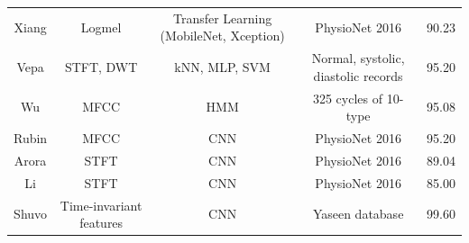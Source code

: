 \begin{table}[h]
\begin{tabularx}{\textwidth}{ccccc}
        Xiang \cite{xiang2023research} & Logmel & Transfer Learning (MobileNet, Xception) & PhysioNet 2016 & 90.23 \\
        Vepa \cite{vepa2009classification} & STFT, DWT & kNN, MLP, SVM & Normal, systolic, diastolic records & 95.20 \\
        Wu \cite{wu2010hidden} & MFCC & HMM & 325 cycles of 10-type & 95.08 \\
        Rubin \cite{rubin2016classifying} & MFCC & CNN & PhysioNet 2016 & 95.20 \\
        Arora \cite{arora2021transfer} & STFT & CNN & PhysioNet 2016 & 89.04 \\
        Li \cite{li2021lightweight} & STFT & CNN & PhysioNet 2016 & 85.00 \\
        Shuvo \cite{shuvo2021cardioxnet} & Time-invariant features & CNN & Yaseen database & 99.60 \\
        \bottomrule
    \end{tabularx}
\end{table}
